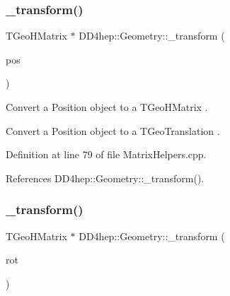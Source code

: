 \hypertarget{group___d_d4_h_e_p___g_e_o_m_e_t_r_y_ga543149f9fccc6961eb19ab307f96e192}{}\label{group___d_d4_h_e_p___g_e_o_m_e_t_r_y_ga543149f9fccc6961eb19ab307f96e192} 
\subsubsection{\texorpdfstring{\+\_\+transform()}{\_transform()}\hspace{0.1cm}{\footnotesize\ttfamily [2/11]}}
{\footnotesize\ttfamily T\+Geo\+H\+Matrix $\ast$ D\+D4hep\+::\+Geometry\+::\+\_\+transform (\begin{DoxyParamCaption}\item[{const \hyperlink{namespace_d_d4hep_1_1_geometry_a55083902099d03506c6db01b80404900}{Geometry\+::\+Position} \&}]{pos }\end{DoxyParamCaption})}



Convert a Position object to a T\+Geo\+H\+Matrix . 

Convert a Position object to a T\+Geo\+Translation . 

Definition at line 79 of file Matrix\+Helpers.\+cpp.



References D\+D4hep\+::\+Geometry\+::\+\_\+transform().

\hypertarget{group___d_d4_h_e_p___g_e_o_m_e_t_r_y_gaf3a07560a5302fbb20eed5a933e611d8}{}\label{group___d_d4_h_e_p___g_e_o_m_e_t_r_y_gaf3a07560a5302fbb20eed5a933e611d8} 
\subsubsection{\texorpdfstring{\+\_\+transform()}{\_transform()}\hspace{0.1cm}{\footnotesize\ttfamily [3/11]}}
{\footnotesize\ttfamily T\+Geo\+H\+Matrix $\ast$ D\+D4hep\+::\+Geometry\+::\+\_\+transform (\begin{DoxyParamCaption}\item[{const \hyperlink{namespace_d_d4hep_1_1_geometry_a24667b2b9c3cec3d5239828db4d52189}{Geometry\+::\+Rotation\+Z\+YX} \&}]{rot }\end{DoxyParamCaption})}



